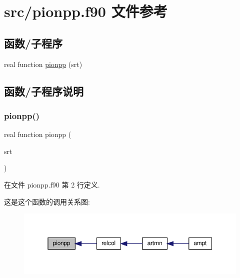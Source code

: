 \hypertarget{pionpp_8f90}{}\section{src/pionpp.f90 文件参考}
\label{pionpp_8f90}
\subsection*{函数/子程序}
\begin{DoxyCompactItemize}
\item 
real function \mbox{\hyperlink{pionpp_8f90_ada8a6fdd32ee29a462ff41cde7391838}{pionpp}} (srt)
\end{DoxyCompactItemize}


\subsection{函数/子程序说明}
\mbox{\label{pionpp_8f90_ada8a6fdd32ee29a462ff41cde7391838}} 
\subsubsection{\texorpdfstring{pionpp()}{pionpp()}}
{\footnotesize\ttfamily real function pionpp (\begin{DoxyParamCaption}\item[{}]{srt }\end{DoxyParamCaption})}



在文件 pionpp.\+f90 第 2 行定义.

这是这个函数的调用关系图\+:
\nopagebreak
\begin{figure}[H]
\begin{center}
\leavevmode
\includegraphics[width=350pt]{pionpp_8f90_ada8a6fdd32ee29a462ff41cde7391838_icgraph}
\end{center}
\end{figure}
